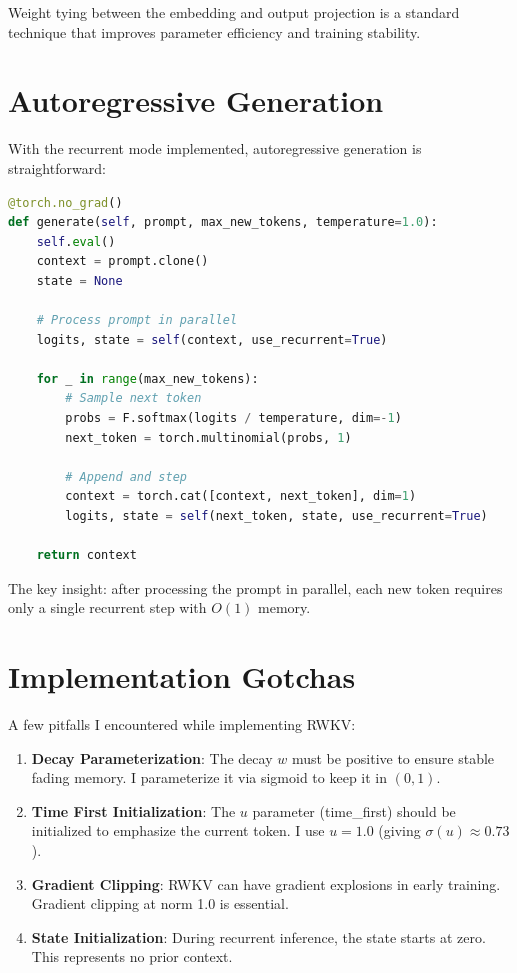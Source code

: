 \documentclass[12pt]{article}
\begin{document}
Weight tying between the embedding and output projection is a standard technique that improves parameter efficiency and training stability.

\section*{Autoregressive Generation}

With the recurrent mode implemented, autoregressive generation is straightforward:

\begin{lstlisting}[language=Python, basicstyle=\small\ttfamily]
@torch.no_grad()
def generate(self, prompt, max_new_tokens, temperature=1.0):
    self.eval()
    context = prompt.clone()
    state = None
    
    # Process prompt in parallel
    logits, state = self(context, use_recurrent=True)
    
    for _ in range(max_new_tokens):
        # Sample next token
        probs = F.softmax(logits / temperature, dim=-1)
        next_token = torch.multinomial(probs, 1)
        
        # Append and step
        context = torch.cat([context, next_token], dim=1)
        logits, state = self(next_token, state, use_recurrent=True)
    
    return context
\end{lstlisting}

The key insight: after processing the prompt in parallel, each new token requires only a single recurrent step with $O(1)$ memory.

\section*{Implementation Gotchas}

A few pitfalls I encountered while implementing RWKV:

\begin{enumerate}
    \item \textbf{Decay Parameterization}: The decay $w$ must be positive to ensure stable fading memory. I parameterize it via sigmoid to keep it in $(0, 1)$.
    
    \item \textbf{Time First Initialization}: The $u$ parameter (time\_first) should be initialized to emphasize the current token. I use $u = 1.0$ (giving $\sigma(u) \approx 0.73$).
    
    \item \textbf{Gradient Clipping}: RWKV can have gradient explosions in early training. Gradient clipping at norm 1.0 is essential.
    
    \item \textbf{State Initialization}: During recurrent inference, the state starts at zero. This represents no prior context.
\end{enumerate}
\end{document}

